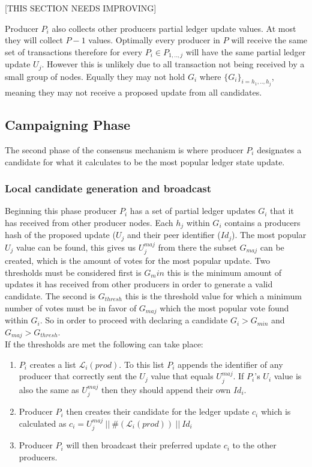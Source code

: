 \documentclass{article}
\begin{document}
[THIS SECTION NEEDS IMPROVING]

Producer $P_i$ also collects other producers partial ledger update values. At most they will collect $P-1$ values. Optimally every producer in $P$ will receive the same set of transactions therefore for every $P_i \in P_{1,..,j}$ will have the same partial ledger update $U_j$. However this is unlikely due to all transaction not being received by a small group of nodes. Equally they may not hold $G_i$ where  $\{G_i\}_{i=h_1,..,h_j}$, meaning they may not receive a proposed update from all candidates. 


\subsection{Campaigning Phase}

The second phase of the consensus mechanism is where producer $P_i$ designates a candidate for what it calculates to be the most popular ledger state update. \\

\subsubsection{Local candidate generation and broadcast}

Beginning this phase producer $P_i$ has a set of partial ledger updates $G_i$ that it has received from other producer nodes. Each $h_j$ within $G_i$ contains a producers hash of the proposed update ($U_j$ and their peer identifier ($Id_j$). The most popular $U_j$ value can be found, this gives us $U_j^{maj}$ from there the subset $G_{maj}$ can be created, which is the amount of votes for the most popular update. Two thresholds must be considered first is $G_min$ this is the minimum amount of updates it has received from other producers in order to generate a valid candidate. The second is $G_{thresh}$ this is the threshold value for which a minimum number of votes must be in favor of $G_{maj}$ which the most popular vote found within $G_i$.  So in order to proceed with declaring a candidate $G_i > G_{min}$ and $G_{maj} > G_{thresh}$. \\

If the thresholds are met the following can take place:

\begin{enumerate}
\item $P_i$ creates a list $\mathcal{L}_i(prod)$. To this list $P_i$ appends the identifier of any producer that correctly sent the $U_j$ value that equals $U_j^{maj}$. If $P_i$'s $U_i$ value is also the same as $U_j^{maj}$ then they should append their own $Id_i$.
\item Producer $P_i$ then creates their candidate for the ledger update $c_i$ which is calculated as $c_i = U_j^{maj}~||~\#(\mathcal{L}_i(prod))~||~Id_i$
\item Producer $P_i$ will then broadcast their preferred update $c_i$ to the other producers. 
\end{enumerate}
\end{document}

